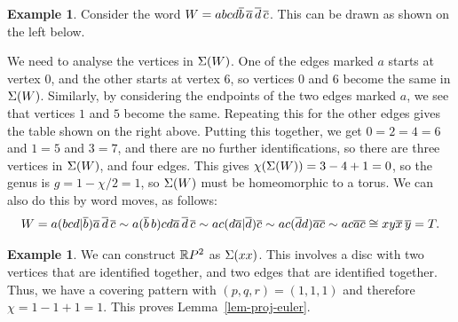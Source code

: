 \documentclass[reqno]{amsart}
\theoremstyle{definition}
\newtheorem{example}[theorem]{Example}
\begin{document}
\begin{example}
 Consider the word $W=abcd\overline{b}\,\overline{a}\,\overline{d}\,\overline{c}$.  This can be drawn as
 shown on the left below.
 \begin{center}
 \end{center}
 We need to analyse the vertices in $\Sigma(W)$.  One of the edges marked
 $a$ starts at vertex $0$, and the other starts at vertex $6$, so
 vertices $0$ and $6$ become the same in $\Sigma(W)$.  Similarly, by
 considering the endpoints of the two edges marked $a$, we see that
 vertices $1$ and $5$ become the same.  Repeating this for the other
 edges gives the table shown on the right above.  Putting this
 together, we get $0=2=4=6$ and $1=5$ and $3=7$, and there are no
 further identifications, so there are three vertices in $\Sigma(W)$, and
 four edges.  This gives $\chi(\Sigma(W))=3-4+1=0$, so the genus is
 $g=1-\chi/2=1$, so $\Sigma(W)$ must be homeomorphic to a torus.  We can
 also do this by word moves, as follows:
 \[ W = 
   a(bcd|\overline{b})\overline{a}\,\overline{d}\,\overline{c}
   \sim a(\overline{b}\,b)cd\overline{a}\,\overline{d}\,\overline{c} 
   \sim ac(d\overline{a}|\overline{d})\overline{c} 
   \sim ac(\overline{d} d)\overline{a}\overline{c} 
   \sim ac\overline{a}\overline{c} \cong xy\overline{x}\,\overline{y} = T.
 \]
\end{example}

\begin{example}\label{eg-proj-euler}
 We can construct $\mathbb{R} P^2$ as $\Sigma(xx)$.  This involves a disc with
 two vertices that are identified together, and two edges that are
 identified together.  Thus, we have a covering pattern with
 $(p,q,r)=(1,1,1)$ and therefore $\chi=1-1+1=1$.  This proves
 Lemma~\ref{lem-proj-euler}. 
\end{example}
\end{document}
